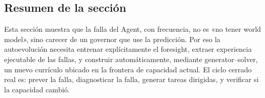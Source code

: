 

\subsection{Resumen de la sección}

Esta sección muestra que la falla del Agent, con frecuencia, no es «no tener world model», sino carecer de un governor que use la predicción. Por eso la autoevolución necesita entrenar explícitamente el foresight, extraer experiencia ejecutable de las fallas, y construir automáticamente, mediante generator--solver, un nuevo currículo ubicado en la frontera de capacidad actual. El ciclo cerrado real es: prever la falla, diagnosticar la falla, generar tareas dirigidas, y verificar si la capacidad cambió.
